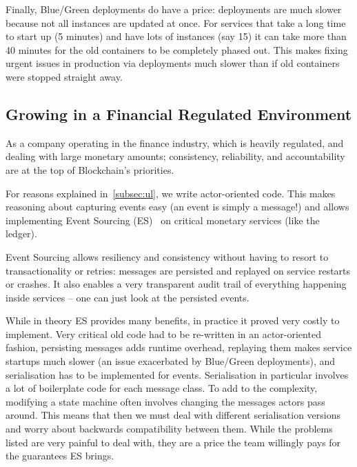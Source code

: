 \documentclass[conference]{IEEEtran}
\begin{document}
    Finally, Blue/Green deployments do have a price: deployments are much slower because not
    all instances are updated at once.
    For services that take a long time to start up (5 minutes) and have lots of instances (say 15)
    it can take more than 40 minutes for the old containers to be completely phased out.
    This makes fixing urgent issues in production via deployments much slower than if old containers were stopped
    straight away.

    \subsection{Growing in a Financial Regulated Environment}\label{subsec:regulated}

    As a company operating in the finance industry, which is heavily regulated, and dealing
    with large monetary amounts;
    consistency, reliability, and accountability are at the top of Blockchain's priorities.

    For reasons explained in~\ref{subsec:ul}, we write actor-oriented code.
    This makes reasoning about capturing events easy (an event is simply a message!) and allows
    implementing Event Sourcing (ES)~\cite{fowlerES} on critical monetary services (like the ledger).

    Event Sourcing allows resiliency and consistency without having to resort to transactionality
    or retries: messages are persisted and replayed on service restarts or crashes.
    It also enables a very transparent audit trail of everything happening inside services -- one
    can just look at the persisted events.

    While in theory ES provides many benefits, in practice it proved very costly to implement.
    Very critical old code had to be re-written in an actor-oriented fashion, persisting messages adds runtime overhead, replaying them makes service startups much slower (an issue exacerbated by Blue/Green deployments), and serialisation has to be implemented for events.
    Serialisation in particular involves a lot of boilerplate code for each message class.
    To add to the complexity, modifying a state machine often involves changing the messages actors
    pass around.
    This means that then we must deal with different serialisation versions and worry about
    backwards compatibility between them.
    While the problems listed are very painful to deal with, they are a price the team willingly pays for the guarantees ES brings.
\end{document}
